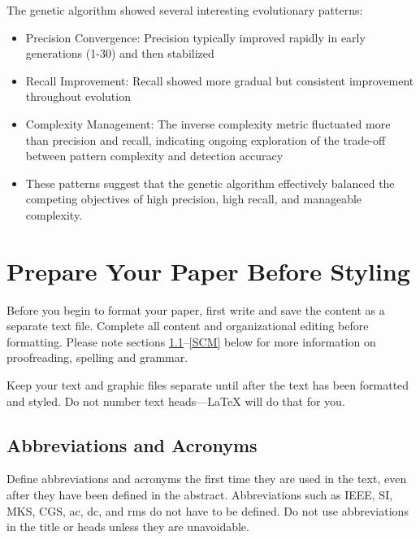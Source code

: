 \documentclass[conference]{IEEEtran}
\begin{document}
The genetic algorithm showed several interesting evolutionary patterns:
\begin{itemize}
    \item Precision Convergence: Precision typically improved rapidly in early generations (1-30) and then stabilized
\item Recall Improvement: Recall showed more gradual but consistent improvement throughout evolution
\item Complexity Management: The inverse complexity metric fluctuated more than precision and recall, indicating ongoing exploration of the trade-off between pattern complexity and detection accuracy
\item
These patterns suggest that the genetic algorithm effectively balanced the competing objectives of high precision, high recall, and manageable complexity.
\end{itemize}







\section{Prepare Your Paper Before Styling}
Before you begin to format your paper, first write and save the content as a
separate text file. Complete all content and organizational editing before
formatting. Please note sections \ref{AA}--\ref{SCM} below for more information on
proofreading, spelling and grammar.

Keep your text and graphic files separate until after the text has been
formatted and styled. Do not number text heads---{\LaTeX} will do that
for you.

\subsection{Abbreviations and Acronyms}\label{AA}
Define abbreviations and acronyms the first time they are used in the text,
even after they have been defined in the abstract. Abbreviations such as
IEEE, SI, MKS, CGS, ac, dc, and rms do not have to be defined. Do not use
abbreviations in the title or heads unless they are unavoidable.
\end{document}
